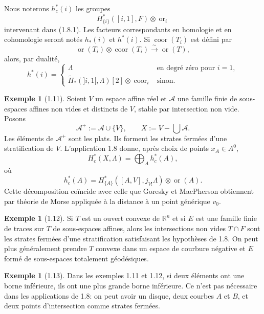 \documentclass[11pt]{article}
\theoremstyle{definition}
\newtheorem{example}[theorem]{Exemple}
\newcommand{\RR}{\mathbb R}
\newcommand{\ornt}{\operatorname{or}}
\newcommand{\coor}{\operatorname{coor}}
\begin{document}
Nous noterons $h_c^*(i)$ les groupes
\[
H^*_{\{i\}}([i,1],F)\otimes\ornt_i
\]
intervenant dans (1.8.1). Les facteurs correspondants en homologie et en cohomologie seront notés $h_*(i)$ et $h^*(i)$. Si $\coor(T_i)$ est défini par
\[
\ornt(T_i)\otimes\coor(T_i)\xrightarrow{\sim}\ornt(T),
\]
alors, par dualité,
\begin{equation}
h^*(i)=
\begin{cases}
\Lambda & \text{en degré zéro pour }i=1,\\
\widetilde H_*(]i,1[,\Lambda)[2]\otimes\coor_i & \text{sinon.}
\end{cases}\tag{1.10.1}
\end{equation}

\begin{example}[1.11]
Soient $V$ un espace affine réel et $\mathcal A$ une famille finie de sous-espaces affines non vides et distincts de $V$, stable par intersection non vide. Posons
\[
\mathcal A^+:=\mathcal A\cup\{V\},\qquad X:=V-\bigcup\mathcal A.
\]
Les éléments de $\mathcal A^+$ sont les plats. Ils forment les strates fermées d'une stratification de $V$. L'application 1.8 donne, après choix de points $x_A\in A^0$,
\begin{equation}
H_c^*(X,\Lambda)=\bigoplus_A h_c^*(A),\tag{1.11.2}
\end{equation}
où
\[
h_c^*(A)=H^*_{\{A\}}([A,V],j_{V!}\Lambda)\otimes\ornt(A).
\]
Cette décomposition coïncide avec celle que Goresky et MacPherson obtiennent par théorie de Morse appliquée à la distance à un point générique $v_0$.
\end{example}

\begin{example}[1.12]
Si $T$ est un ouvert convexe de $\RR^n$ et si $E$ est une famille finie de traces sur $T$ de sous-espaces affines, alors les intersections non vides $T\cap F$ sont les strates fermées d'une stratification satisfaisant les hypothèses de 1.8. On peut plus généralement prendre $T$ convexe dans un espace de courbure négative et $E$ formé de sous-espaces totalement géodésiques.
\end{example}

\begin{example}[1.13]
Dans les exemples 1.11 et 1.12, si deux éléments ont une borne inférieure, ils ont une plus grande borne inférieure. Ce n'est pas nécessaire dans les applications de 1.8: on peut avoir un disque, deux courbes $A$ et $B$, et deux points d'intersection comme strates fermées.
\end{example}
\end{document}
